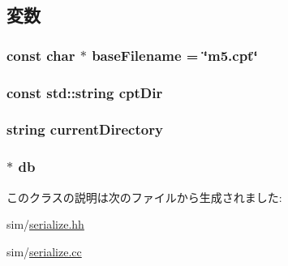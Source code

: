\subsection{変数}
\hypertarget{classCheckpoint_ad829fa8f586febadce60e760dba52a91}{
\subsubsection[{baseFilename}]{\setlength{\rightskip}{0pt plus 5cm}const char $\ast$ {\bf baseFilename} = \char`\"{}m5.cpt\char`\"{}}}
\label{classCheckpoint_ad829fa8f586febadce60e760dba52a91}
\hypertarget{classCheckpoint_a45e71014090a29b10f5e9c4bedc84f84}{
\subsubsection[{cptDir}]{\setlength{\rightskip}{0pt plus 5cm}const std::string {\bf cptDir}}}
\label{classCheckpoint_a45e71014090a29b10f5e9c4bedc84f84}
\hypertarget{classCheckpoint_a2473a873b642e739c91a062766f8bcde}{
\subsubsection[{currentDirectory}]{\setlength{\rightskip}{0pt plus 5cm}string {\bf currentDirectory}}}
\label{classCheckpoint_a2473a873b642e739c91a062766f8bcde}
\hypertarget{classCheckpoint_aebb2ee2cd2d3bf87dbcc0880b4c55f00}{
\subsubsection[{db}]{$\ast$ {\bf db}}}
\label{classCheckpoint_aebb2ee2cd2d3bf87dbcc0880b4c55f00}


このクラスの説明は次のファイルから生成されました:\begin{DoxyCompactItemize}
\item 
sim/\hyperlink{serialize_8hh}{serialize.hh}\item 
sim/\hyperlink{serialize_8cc}{serialize.cc}\end{DoxyCompactItemize}
